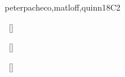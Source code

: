 \begin{syllabus}
\begin{competences}
    \item {} %
    \item {}
    \item {} %
    \item {} %
    \item {} %
  \item {} %
\end{competences}

\begin{unit}{\PDParallelismFundamentals}{}{peterpacheco,matloff,quinn}{18}{C2}
\begin{topics}%
    \item \PDParallelismFundamentalsTopicMultiple
    \item \PDParallelismFundamentalsTopicGoals
    \item \PDParallelismFundamentalsTopicParallelism
    \item \PDParallelismFundamentalsTopicProgramming
\end{topics}    
\begin{learningoutcomes}%
    \item \PDParallelismFundamentalsLODistinguishUsing~[\Familiarity] %
    \item \PDParallelismFundamentalsLODistinguishMultiple~[\Familiarity] %
    \item \PDParallelismFundamentalsLODistinguishData~[\Familiarity] %
\end{learningoutcomes}%
\end{unit}


\end{syllabus}
